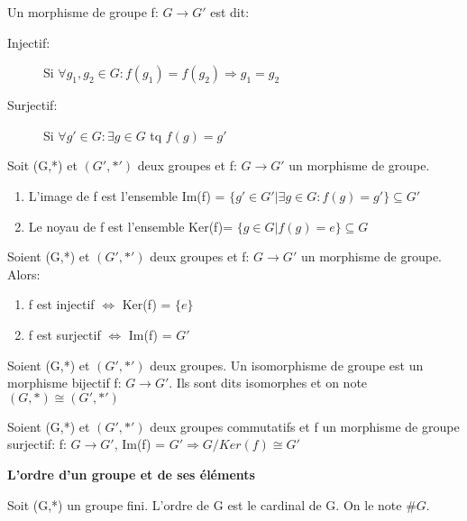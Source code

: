 \begin{defn}
Un morphisme de groupe f: $G \rightarrow {G}'$ est dit:
	\begin{description}
	\item[Injectif:] Si $\forall g_1,g_2 \in G: f(g_1)=f(g_2) \Rightarrow g_1 = g_2$
	\item[Surjectif:] Si $\forall {g}' \in G: \exists g\in G$ tq $f(g) = {g}'$
	\end{description}
\end{defn}

\begin{defn}
Soit (G,*) et $({G}',{*}')$ deux groupes et f: $G \rightarrow {G}'$ un morphisme de groupe.

	\begin{enumerate}[-]
	\item L'image de f est l'ensemble Im(f) = $\{ {g}' \in {G}' | \exists g \in G : f(g) = {g}' \} \subseteq {G}'$
	\item Le noyau de f est l'ensemble Ker(f)= $\{ g\in G | f(g) = e \} \subseteq G$
	\end{enumerate}
\end{defn}

\begin{prop}
Soient (G,*) et $({G}',{*}')$ deux groupes et f: $G \rightarrow {G}'$ un morphisme de groupe. Alors:
	\begin{enumerate}
	\item f est injectif $\Leftrightarrow$ Ker(f) = $\{ e \}$
	\item f est surjectif $\Leftrightarrow$ Im(f) = ${G}'$
	\end{enumerate}
\end{prop}

\begin{defn}
Soient (G,*) et $({G}',{*}')$ deux groupes. Un isomorphisme de groupe est un morphisme bijectif f: $G \rightarrow {G}'$. Ils sont dits isomorphes et on note $(G,*) \cong ({G}',{*}')$
\end{defn}

\begin{thrm}
Soient (G,*) et $({G}',{*}')$ deux groupes commutatifs et f un morphisme de groupe surjectif: f: $G \rightarrow {G}'$, Im(f) = ${G}' \Rightarrow G/Ker(f) \cong {G}'$ 
\end{thrm}

\textbf{L'ordre d'un groupe et de ses éléments}

\begin{defn}
Soit (G,*) un groupe fini. L'ordre de G est le cardinal de G. On le note $\#G$.
\end{defn}

